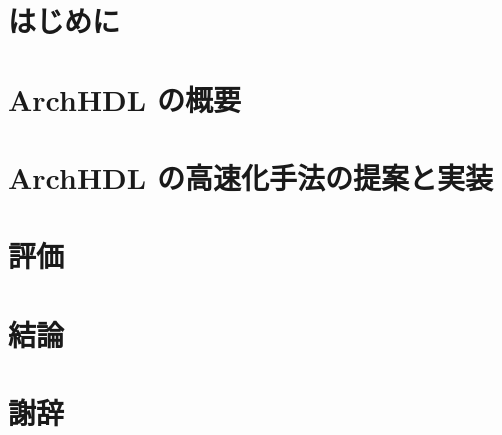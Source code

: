 \begin{abstract}
 
\end{abstract}

\maketitle

\section{はじめに}



\section{ArchHDL の概要} \label{s:summary}



\section{ArchHDL の高速化手法の提案と実装} \label{s:method}



\section{評価} \label{s:evaluation}



\section{結論} \label{s:conclusion}



\section{謝辞} \label{s:acknowledgment}





